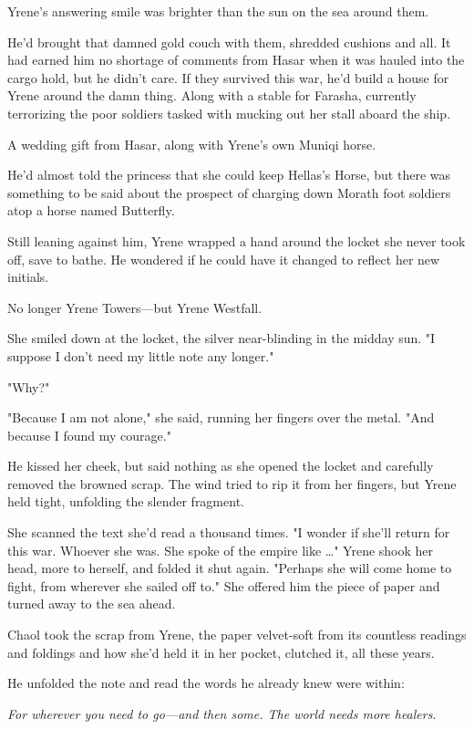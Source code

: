 Yrene's answering smile was brighter than the sun on the sea around them.

He'd brought that damned gold couch with them, shredded cushions and all. It had earned him no shortage of comments from Hasar when it was hauled into the cargo hold, but he didn't care. If they survived this war, he'd build a house for Yrene around the damn thing. Along with a stable for Farasha, currently terrorizing the poor soldiers tasked with mucking out her stall aboard the ship.

A wedding gift from Hasar, along with Yrene's own Muniqi horse.

He'd almost told the princess that she could keep Hellas's Horse, but there was something to be said about the prospect of charging down Morath foot soldiers atop a horse named Butterfly.

Still leaning against him, Yrene wrapped a hand around the locket she never took off, save to bathe. He wondered if he could have it changed to reflect her new initials.

No longer Yrene Towers---but Yrene Westfall.

She smiled down at the locket, the silver near-blinding in the midday sun. "I suppose I don't need my little note any longer."

"Why?"

"Because I am not alone," she said, running her fingers over the metal. "And because I found my courage."

He kissed her cheek, but said nothing as she opened the locket and carefully removed the browned scrap. The wind tried to rip it from her fingers, but Yrene held tight, unfolding the slender fragment.

She scanned the text she'd read a thousand times. "I wonder if she'll return for this war. Whoever she was. She spoke of the empire like
\ldots" Yrene shook her head, more to herself, and folded it shut again. "Perhaps she will come home to fight, from wherever she sailed off to." She offered him the piece of paper and turned away to the sea ahead.

Chaol took the scrap from Yrene, the paper velvet-soft from its countless readings and foldings and how she'd held it in her pocket, clutched it, all these years.

He unfolded the note and read the words he already knew were within:

\emph{For wherever you need to go---and then some. The world needs more healers}.

